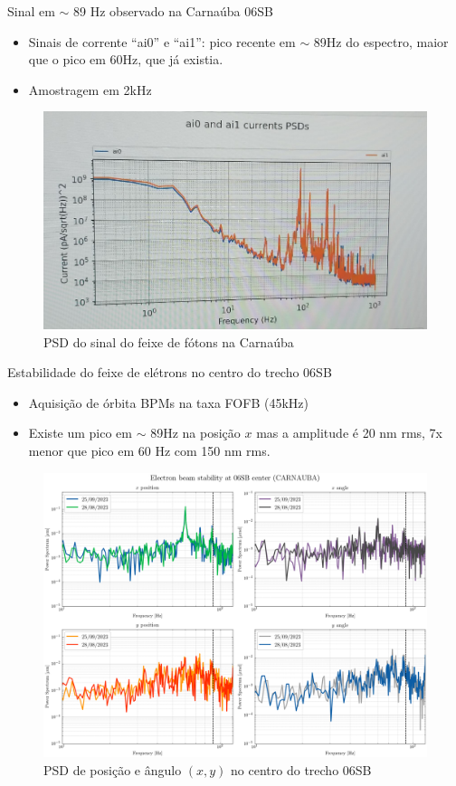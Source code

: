 \documentclass{beamer}					%
\begin{document}
\begin{frame}{Sinal em $\sim$ 89 Hz observado na Carnaúba 06SB}
    
    \begin{itemize}
		\item Sinais de corrente ``ai0'' e ``ai1'': pico recente em $\sim$ 89Hz do espectro, maior que o pico em 60Hz, que já existia.
        \item Amostragem em 2kHz
	\end{itemize}

    \begin{figure}[H]
		\centering
        \includegraphics[width=.6\textwidth]{figures/carnauba-89hz-signal.png}
        \caption{PSD do sinal do feixe de fótons na Carnaúba}
        \label{fig:figure1}
    \end{figure}
    
\end{frame}



\begin{frame}{Estabilidade do feixe de elétrons no centro do trecho 06SB}
    
    \begin{itemize}
		\item Aquisição de órbita BPMs na taxa FOFB (45kHz)
        \item Existe um pico em $\sim$ 89Hz na posição $x$ mas a amplitude é 20 nm rms, 7x menor que pico em 60 Hz com 150 nm rms.
	\end{itemize}

    \begin{figure}[H]
		\centering
        \includegraphics[width=.7\textwidth]{2023-10-06/figures/beam_stability_carnauba_compare_zoom_freqs.png}
        \caption{PSD de posição e ângulo $(x, y)$ no centro do trecho 06SB}
        \label{fig:figure1}
    \end{figure}
    
\end{frame}
\end{document}
